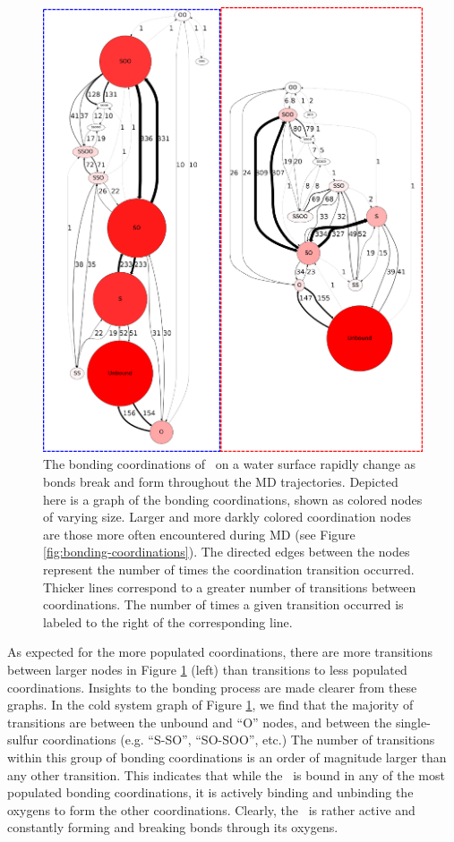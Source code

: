\documentclass{article}
\begin{document}
\begin{figure}[h!]
	\begin{center}
		\includegraphics[scale=1.0]{coordination-transitions.png}
		\caption{The bonding coordinations of \suldiox~on a water surface rapidly change as bonds break and form throughout the MD trajectories. Depicted here is a graph of the bonding coordinations, shown as colored nodes of varying size. Larger and more darkly colored coordination nodes are those more often encountered during MD (see Figure \ref{fig:bonding-coordinations}). The directed edges between the nodes represent the number of times the coordination transition occurred. Thicker lines correspond to a greater number of transitions between coordinations. The number of times a given transition occurred is labeled to the right of the corresponding line.}
		\label{fig:coordination-transitions}
	\end{center}
\end{figure}

As expected for the more populated coordinations, there are more transitions between larger nodes in Figure \ref{fig:coordination-transitions} (left) than transitions to less populated coordinations. Insights to the bonding process are made clearer from these graphs. In the cold system graph of Figure \ref{fig:coordination-transitions}, we find that the majority of transitions are between the unbound and ``O'' nodes, and between the single-sulfur coordinations (e.g. ``S-SO'', ``SO-SOO'', etc.) The number of transitions within this group of bonding coordinations is an order of magnitude larger than any other transition. This indicates that while the \suldiox~is bound in any of the most populated bonding coordinations, it is actively binding and unbinding the oxygens to form the other coordinations. Clearly, the \suldiox~is rather active and constantly forming and breaking bonds through its oxygens.
\end{document}
